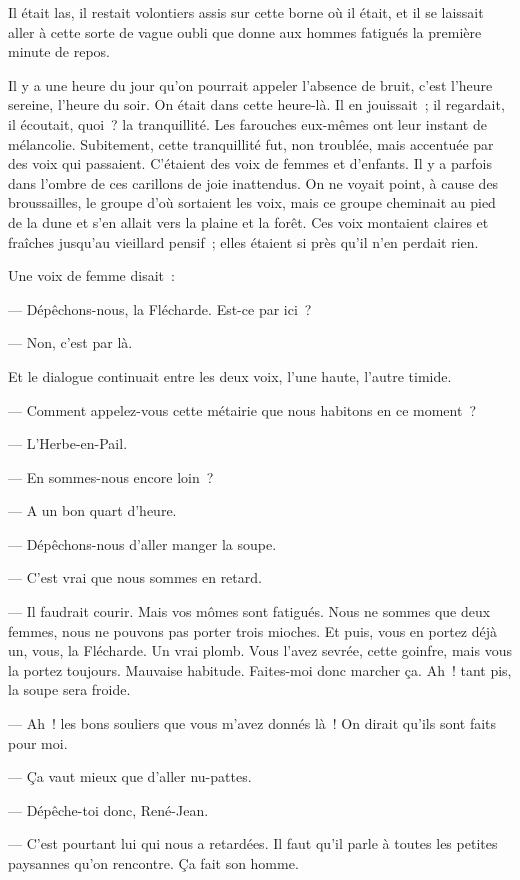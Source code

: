 \documentclass[french,twoside]{book} %
\begin{document}
Il était las, il restait volontiers assis sur cette borne où il était, et il se laissait aller à cette sorte de vague oubli que donne aux hommes fatigués la première minute de repos.\par
Il y a une heure du jour qu’on pourrait appeler l’absence de bruit, c’est l’heure sereine, l’heure du soir. On était dans cette heure-là. Il en jouissait ; il regardait, il écoutait, quoi ? la tranquillité. Les farouches eux-mêmes ont leur instant de mélancolie. Subitement, cette tranquillité fut, non troublée, mais accentuée par des voix qui passaient. C’étaient des voix de femmes et d’enfants. Il y a parfois dans l’ombre de ces carillons de joie inattendus. On ne voyait point, à cause des broussailles, le groupe d’où sortaient les voix, mais ce groupe cheminait au pied de la dune et s’en allait vers la plaine et la forêt. Ces voix montaient claires et fraîches jusqu’au vieillard pensif ; elles étaient si près qu’il n’en perdait rien.\par
Une voix de femme disait :\par
— Dépêchons-nous, la Flécharde. Est-ce par ici ?\par
— Non, c’est par là.\par
Et le dialogue continuait entre les deux voix, l’une haute, l’autre timide.\par
— Comment appelez-vous cette métairie que nous habitons en ce moment ?\par
— L’Herbe-en-Pail.\par
— En sommes-nous encore loin ?\par
— A un bon quart d’heure.\par
 — Dépêchons-nous d’aller manger la soupe.\par
— C’est vrai que nous sommes en retard.\par
— Il faudrait courir. Mais vos mômes sont fatigués. Nous ne sommes que deux femmes, nous ne pouvons pas porter trois mioches. Et puis, vous en portez déjà un, vous, la Flécharde. Un vrai plomb. Vous l’avez sevrée, cette goinfre, mais vous la portez toujours. Mauvaise habitude. Faites-moi donc marcher ça. Ah ! tant pis, la soupe sera froide.\par
— Ah ! les bons souliers que vous m’avez donnés là ! On dirait qu’ils sont faits pour moi.\par
— Ça vaut mieux que d’aller nu-pattes.\par
— Dépêche-toi donc, René-Jean.\par
— C’est pourtant lui qui nous a retardées. Il faut qu’il parle à toutes les petites paysannes qu’on rencontre. Ça fait son homme.\par
\end{document}
